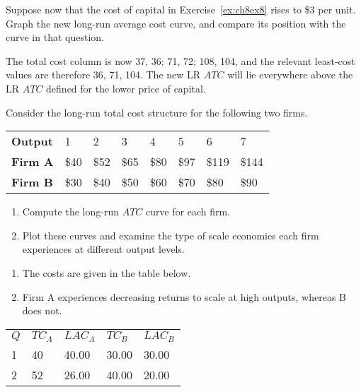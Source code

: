 \begin{enumialphparenastyle}
\begin{ex}\label{ex:ch8ex9}
Suppose now that the cost of capital in Exercise~\ref{ex:ch8ex8} rises to \$3 per unit. Graph the new long-run average cost curve, and compare its position with the curve in that question.
\begin{sol}
	The total cost column is now 37, 36; 71, 72; 108, 104, and the relevant least-cost values are therefore 36, 71, 104. The new LR $ATC$ will lie everywhere above the LR $ATC$ defined for the lower price of capital. 
	
\end{sol}
\end{ex}

\begin{ex}\label{ex:ch8ex10}
Consider the long-run total cost structure for the following two firms.
\begin{center}
\begin{tabu} to \linewidth {|X[1,c]X[1,c]X[1,c]X[1,c]X[1,c]X[1,c]X[1,c]X[1,c]|}	\hline
{}	\textbf{Output}	&	1	&	2	&	3	&	4	&	5	&	6	&	7	\\
						\textbf{Firm A}	&	\$40	&	\$52	&	\$65	&	\$80	&	\$97	&	\$119	&	\$144	\\
	\textbf{Firm B}	&	\$30	&	\$40	&	\$50	&	\$60	&	\$70	&	\$80	&	\$90	\\	\hline
\end{tabu}
\end{center}
\begin{enumerate}
	\item	Compute the long-run $ATC$ curve for each firm.
	\item	Plot these curves and examine the type of scale economies each firm experiences at different output levels.
\end{enumerate}
\begin{sol}
\begin{enumerate}
	\item	The costs are given in the table below.
	\item	Firm A experiences decreasing returns to scale at high outputs, whereas B does not.
\end{enumerate}
\begin{center}
	\begin{tabu} to \linewidth {|X[1,c]X[1,c]X[1,c]X[1,c]X[1,c]|}	\hline
		 $Q$ & $TC_A$ & $LAC_A$ & $TC_B$ & $LAC_B$ \\
		1	&	40	&	40.00	&	30.00	&	30.00	\\
		2	&	52	&	26.00	&	40.00	&	20.00	\\

\end{tabu}
\end{center}
\end{sol}
\end{ex}
\end{enumialphparenastyle}
